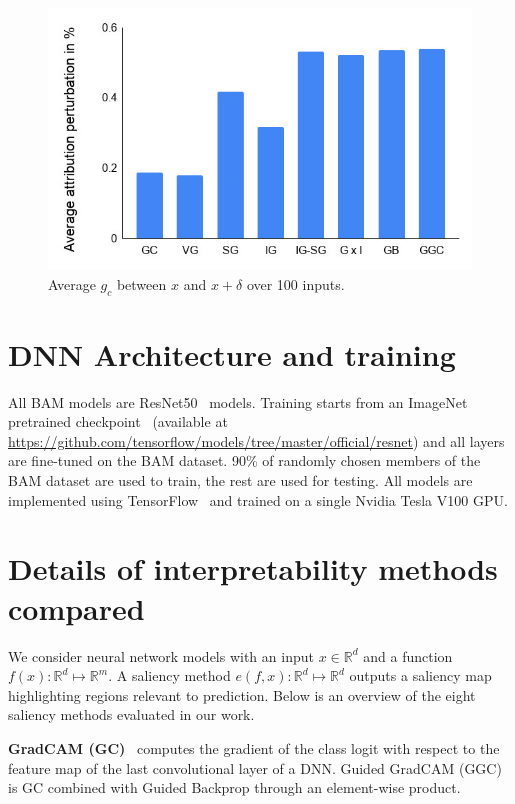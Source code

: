 \begin{appendix}
\begin{figure}[ht]
  \includegraphics[width=.8\linewidth]{figures/ii_bar_raw.jpg}
  \setlength\belowcaptionskip{2ex}
  \caption{Average $g_c$ between $x$ and $x+\delta$ over 100 inputs.}
  \label{fig:ii_bar_raw}
\end{figure}


\section{DNN Architecture and training}
All BAM models are ResNet50~\cite{he2016deep} models. Training starts from an ImageNet pretrained checkpoint~\cite{Russakovsky15} (available at \url{https://github.com/tensorflow/models/tree/master/official/resnet}) and all layers are fine-tuned on the BAM dataset. 90\% of randomly chosen members of the BAM dataset are used to train, the rest are used for testing. All models are implemented using TensorFlow~\cite{abadi2016tensorflow} and trained on a single Nvidia Tesla V100 GPU. 

\section{Details of interpretability methods compared}

We consider neural network models with an input $x \in \mathbb{R}^d$ and a function $f(x): \mathbb{R}^d \mapsto \mathbb{R}^m$. A saliency method $e(f, x): \mathbb{R}^d \mapsto \mathbb{R}^d$ outputs a saliency map highlighting regions relevant to prediction. Below is an overview of the eight saliency methods evaluated in our work.

\textbf{GradCAM (GC)}~\cite{Selvaraju16} computes the gradient of the class logit with respect to the feature map of the last convolutional layer of a DNN. Guided GradCAM (GGC) is GC combined with Guided Backprop through an element-wise product.


\end{appendix}
